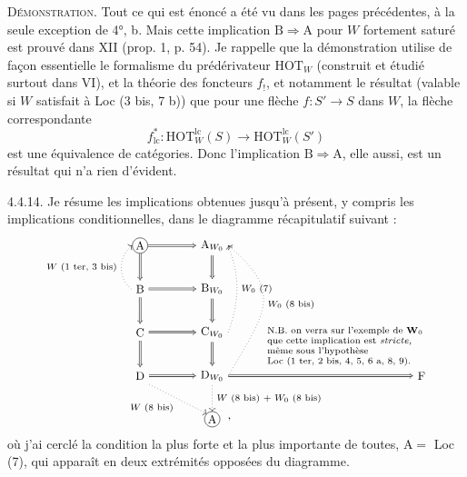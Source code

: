 \noindent\textsc{Démonstration}. Tout ce qui est énoncé a été vu dans les pages précédentes, à la seule exception de 4°, b. Mais cette implication $\mathrm{B}\Longrightarrow\mathrm{A}$ pour $W$ fortement saturé est prouvé dans XII (prop. 1, p. 54). Je rappelle que la démonstration utilise de façon essentielle le %
%
formalisme du prédérivateur $\mathrm{HOT}_W$ (construit et étudié surtout dans VI), et la théorie des foncteurs $f_!$, et notamment le résultat (valable si $W$ satisfait à Loc (3 bis, 7 b)) que pour une flèche $f:S'\longrightarrow S$ dans $W$, la flèche correspondante
\[
f^*_{\mathrm{lc}}:\mathrm{HOT}^{\mathrm{lc}}_W(S)\longrightarrow\mathrm{HOT}^{\mathrm{lc}}_W(S')
\]
est une équivalence de catégories. Donc l'implication $\mathrm{B}\Longrightarrow\mathrm{A}$, elle aussi, est un résultat qui n'a rien d'évident.

\noindent{}%
4.4.14. Je résume les implications obtenues jusqu'à présent, y compris les implications conditionnelles, dans le diagramme récapitulatif suivant :
\[
\begin{tikzpicture}[baseline=(C.base),font=\small]
\node[draw,circle,inner sep=1pt] (A) at (0,0) {$\mathrm A$};
\node (AW) at (2,0) {$\mathrm A_{W_0}$};
\node (B) at (0,-1.2) {$\mathrm B$};
\node (BW) at (2,-1.2) {$\mathrm B_{W_0}$};
\node (C) at (0,-2.4) {$\mathrm C$};
\node (CW) at (2,-2.4) {$\mathrm C_{W_0}$};
\node (D) at (0,-3.6) {$\mathrm D$};
\node (DW) at (2,-3.6) {$\mathrm D_{W_0}$};
\node (F) at (7.8,-3.6) {$\mathrm F$};
\node[draw,circle,inner sep=1pt] (Ab) at (2,-4.8) {$\mathrm A$};
\node[anchor=west] at (2.25,-4.8) {$\,,$};
\foreach \p/\q in {A/AW,B/BW,C/CW,D/DW,A/B,B/C,C/D,AW/BW,BW/CW,CW/DW,DW/F}
  \draw[double,double distance=1pt,-{Implies}] (\p) -- (\q);
\draw[dotted,->] (B.west) to[out=145,in=215] node[left,font=\scriptsize] {$W$ (1 ter, 3 bis)} (A.west);
\draw[dotted,->] (CW.east) to[out=70,in=-70] node[right,font=\scriptsize] {$W_0$ (7)} (AW.east);
\draw[dotted,->] (DW.east) to[out=60,in=-40,looseness=1.45] node[right,font=\scriptsize] {$W_0$ (8 bis)} (AW.east);
\draw[dotted,->] (D.south east) -- node[below left,font=\scriptsize] {$W$ (8 bis)} (Ab.north west);
\draw[dotted,->] (DW) -- node[right,font=\scriptsize] {$W$ (8 bis) $+$ $W_0$ (8 bis)} (Ab);
\node[anchor=south west,align=left,font=\scriptsize] at (3.4,-3.45) {N.B. on verra sur l'exemple de $\mathbf{W}_0$\\
que cette implication est \textit{stricte,}\\
même sous l'hypothèse\\
Loc (1 ter, 2 bis, 4, 5, 6 a, 8, 9).};
\end{tikzpicture}
\]
où j'ai cerclé la condition la plus forte et la plus importante de toutes, $\mathrm{A}=$ Loc (7), qui apparaît en deux extrémités opposées du diagramme.

